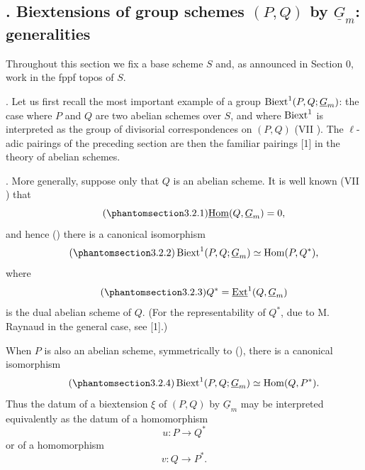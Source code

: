 
\subsection*{. Biextensions of group schemes $(P,Q)$ by
$\underline G_m$: generalities}

Throughout this section we fix a base scheme $S$ and, as announced in
Section 0, work in the fppf topos of $S$.

\medskip
\noindent {}.  Let us first recall the most important example of a
group $\Biext^1(P,Q;\underline G_m)$: the case where $P$ and $Q$ are
two abelian schemes over $S$, and where $\operatorname{Biext}^1$ is interpreted as
the group of divisorial correspondences on $(P,Q)$ (VII ).  The
$\ell$-adic pairings of the preceding section are then the familiar
pairings [1] in the theory of abelian schemes.

\medskip
\noindent {}.  More generally, suppose only that $Q$ is an abelian
scheme.  It is well known (VII ) that
\begin{equation}\tag{\SGARefTarget{sga7.sga7i.eviii.n3-2-1}{3.2.1}}
 \uHom(Q,\underline G_m)=0,
\end{equation}
and hence () there is a canonical isomorphism
\begin{equation}\tag{\SGARefTarget{sga7.sga7i.eviii.n3-2-2}{3.2.2}}
 \Biext^1(P,Q;\underline G_m)\simeq\Hom(P,Q^*),
\end{equation}
where
\begin{equation}\tag{\SGARefTarget{sga7.sga7i.eviii.n3-2-3}{3.2.3}}
 Q^*=\uExt^1(Q,\underline G_m)
\end{equation}
is the dual abelian scheme of $Q$.  (For the representability of
$Q^*$, due to M. Raynaud in the general case, see [1].)

When $P$ is also an abelian scheme, symmetrically to (), there is
a canonical isomorphism
\begin{equation}\tag{\SGARefTarget{sga7.sga7i.eviii.n3-2-4}{3.2.4}}
 \Biext^1(P,Q;\underline G_m)\simeq\Hom(Q,P^*).
\end{equation}
Thus the datum of a biextension $\xi$ of $(P,Q)$ by $\underline G_m$
may be interpreted equivalently as the datum of a homomorphism
\[
 u:P\longrightarrow Q^*
\]
or of a homomorphism
\[
 v:Q\longrightarrow P^*.
\]

